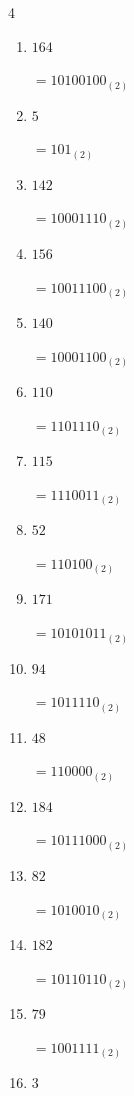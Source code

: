 \begin{multicols}{4}
\begin{enumerate}
        $=1110110_{(2)}$

  \item $164$

        $=10100100_{(2)}$

  \item $5$

        $=101_{(2)}$

  \item $142$

        $=10001110_{(2)}$

  \item $156$

        $=10011100_{(2)}$

  \item $140$

        $=10001100_{(2)}$

  \item $110$

        $=1101110_{(2)}$

  \item $115$

        $=1110011_{(2)}$

  \item $52$

        $=110100_{(2)}$

  \item $171$

        $=10101011_{(2)}$

  \item $94$

        $=1011110_{(2)}$

  \item $48$

        $=110000_{(2)}$

  \item $184$

        $=10111000_{(2)}$

\columnbreak %

  \item $82$

        $=1010010_{(2)}$

  \item $182$

        $=10110110_{(2)}$

  \item $79$

        $=1001111_{(2)}$

  \item $3$


\end{enumerate}
\end{multicols}
